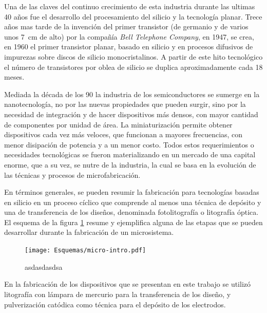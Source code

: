 		Una de las claves del continuo crecimiento de esta industria durante las ultimas 40 años fue el desarrollo del procesamiento del silicio y la tecnología planar. Trece años mas tarde de la invención del primer transistor (de germanio y de varios unos \SI{7}{\cm} de alto) por la compañía \textit{Bell Telephone Company}, en 1947, se crea, en 1960 el primer transistor planar, basado en silicio y en procesos difusivos de impurezas sobre discos de silicio monocristalinos. A partir de este hito tecnológico el número de transistores por oblea de silicio se duplica aproximadamente cada 18 meses. 
		
		Mediada la década de los 90 la industria de los semiconductores se sumerge en la nanotecnología, no por las nuevas propiedades que pueden surgir, sino por la necesidad de integración y de hacer dispositivos más densos, con mayor cantidad de componentes por unidad de área. La miniaturización permite obtener dispositivos cada vez más  veloces, que funcionan a mayores frecuencias, con menor disipación de potencia y a un menor costo. Todos estos requerimientos o necesidades tecnológicas se fueron materializando en un mercado de una capital enorme, que a su vez, se nutre de la industria, la cual se basa en la evolución de las técnicas y procesos de microfabricación.

		En términos generales, se pueden resumir la fabricación para tecnologías basadas en silicio en un proceso cíclico que comprende al menos una técnica de depósito y una de transferencia de los diseños, denominada fotolitografía o litografía óptica. El esquema de la figura \ref{fig:micro-intro} resume y ejemplifica alguna de las etapas que se pueden desarrollar durante la fabricación de un microsistema.
		
 			\begin{figure}[th!]
 				\begin{center}
 				\texttt{[image: Esquemas/micro-intro.pdf]}
 				\caption[Etapas de los procesos de microfabricación]{asdasdasdsa}
 		   		\label{fig:micro-intro}
 		    	\end{center}
 		    	\end{figure}

		En la fabricación de los dispositivos que se presentan en este trabajo se utilizó litografía con lámpara de mercurio para la transferencia de los diseño, y pulverización catódica como técnica para el depósito de los electrodos.

